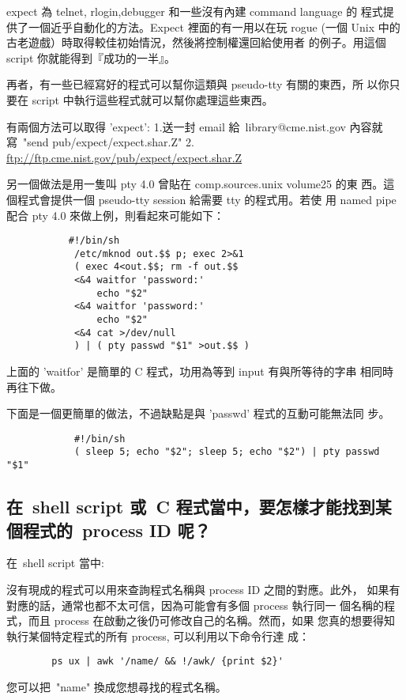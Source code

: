 \documentclass{article}
\begin{document}
\begin{CJK*}{Bg5}{ming}
	expect 為 telnet, rlogin,debugger 和一些沒有內建 command language 的
        程式提供了一個近乎自動化的方法。Expect 裡面的有一用以在玩 rogue 
	(一個 Unix 中的古老遊戲）時取得較佳初始情況，然後將控制權還回給使用者
	的例子。用這個 script 你就能得到『成功的一半』。

	再者，有一些已經寫好的程式可以幫你這類與 pseudo-tty 有關的東西，所
	以你只要在 script 中執行這些程式就可以幫你處理這些東西。

	有兩個方法可以取得 'expect':
	1.送一封 email 給~library@cme.nist.gov 內容就寫~"send 
	  pub/expect/expect.shar.Z"
	2. \url{ftp://ftp.cme.nist.gov/pub/expect/expect.shar.Z}

	另一個做法是用一隻叫 pty 4.0 曾貼在 comp.sources.unix volume25 的東
	西。這個程式會提供一個 pseudo-tty session 給需要 tty 的程式用。若使
	用 named pipe 配合 pty 4.0 來做上例，則看起來可能如下：
\begin{verbatim}
 	       #!/bin/sh
	        /etc/mknod out.$$ p; exec 2>&1
	        ( exec 4<out.$$; rm -f out.$$
	        <&4 waitfor 'password:'
	            echo "$2"
	        <&4 waitfor 'password:'
	            echo "$2"
	        <&4 cat >/dev/null
	        ) | ( pty passwd "$1" >out.$$ )
\end{verbatim}

	上面的 'waitfor' 是簡單的 C 程式，功用為等到 input 有與所等待的字串
	相同時再往下做。

	下面是一個更簡單的做法，不過缺點是與 'passwd' 程式的互動可能無法同
	步。
\small
\begin{verbatim}
	        #!/bin/sh
	        ( sleep 5; echo "$2"; sleep 5; echo "$2") | pty passwd "$1"
\end{verbatim}
\normalsize

\subsection{在~shell script 或~C 程式當中，要怎樣才能找到某個程式的~process ID 
        呢？}

	在~shell script 當中:

	沒有現成的程式可以用來查詢程式名稱與 process ID 之間的對應。此外，
	如果有對應的話，通常也都不太可信，因為可能會有多個 process 執行同一
	個名稱的程式，而且 process 在啟動之後仍可修改自己的名稱。然而，如果
	您真的想要得知執行某個特定程式的所有 process, 可以利用以下命令行達
	成：
\begin{verbatim}
		ps ux | awk '/name/ && !/awk/ {print $2}'
\end{verbatim}
	您可以把~"name" 換成您想尋找的程式名稱。


\end{CJK*}
\end{document}

